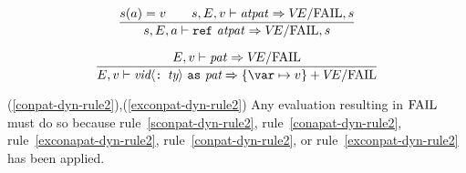\begin{equation}	%
\frac{\s(\A)=\V\qquad\s,\E,\V\ts\atpat\ra\VE/\fail,\s}
     {\s,\E,\A\ts\REF\ \atpat\ra \VE/\fail,\s}\index{57.0}
\end{equation}


\begin{equation}	%
\frac{\E,\V\ts\pat\ra\VE/\fail}
     {\E,\V\ts\layeredpat\ra\{\var\mapsto\V\}+\VE/\fail}
\end{equation}
%
%
\comments
\begin{description}
\item{(\ref{conpat-dyn-rule2}),(\ref{exconpat-dyn-rule2})}
  Any evaluation resulting in ${\rm FAIL}$ must do so because 
rule~\ref{sconpat-dyn-rule2},
rule~\ref{conapat-dyn-rule2},
rule~\ref{exconapat-dyn-rule2},
rule~\ref{conpat-dyn-rule2},
or rule~\ref{exconpat-dyn-rule2} has been
applied.
\end{description}
